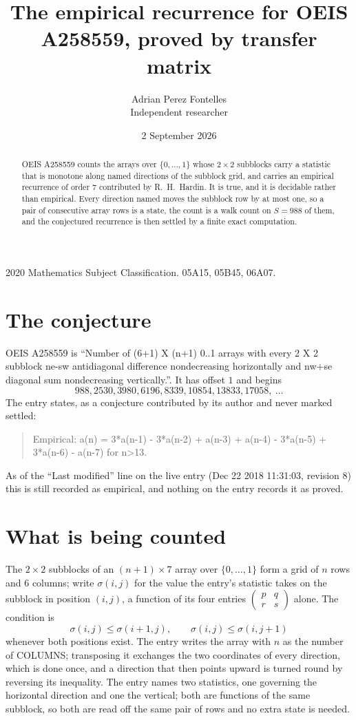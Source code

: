 \documentclass[11pt,a4paper]{article}
\title{The empirical recurrence for OEIS A258559, proved by transfer matrix}
\author{Adrian Perez Fontelles\\ \small Independent researcher}
\date{2 September 2026}
\theoremstyle{plain}
\theoremstyle{definition}
\begin{document}
\maketitle

\begin{abstract}
OEIS A258559 counts the arrays over $\{0,\dots,1\}$ whose $2\times2$ subblocks carry a
statistic that is monotone along named directions of the subblock grid, and carries an
empirical recurrence of order $7$ contributed by R.~H.~Hardin. It is true, and it is
decidable rather than empirical. Every direction named moves the subblock row by at most one,
so a pair of consecutive array rows is a state, the count is a walk count on $S=988$ of them,
and the conjectured recurrence is then settled by a finite exact computation.
\end{abstract}

\noindent\small 2020 Mathematics Subject Classification. 05A15, 05B45, 06A07.\normalsize

\section{The conjecture}

OEIS A258559 is ``Number of (6+1) X (n+1) 0..1 arrays with every 2 X 2 subblock ne-sw antidiagonal difference nondecreasing horizontally and nw+se diagonal sum nondecreasing vertically.''. It has offset $1$ and begins
\[
988, 2530, 3980, 6196, 8339, 10854, 13833, 17058,\ \dots
\]
The entry states, as a conjecture contributed by its author and never marked settled:
\begin{quote}
Empirical: a(n) = 3*a(n-1) - 3*a(n-2) + a(n-3) + a(n-4) - 3*a(n-5) + 3*a(n-6) - a(n-7) for n>13.
\end{quote}
As of the ``Last modified'' line on the live entry (Dec 22 2018 11:31:03, revision 8) this is still
recorded as empirical, and nothing on the entry records it as proved.

\section{What is being counted}

The $2\times2$ subblocks of an $(n+1)\times7$ array over $\{0,\dots,1\}$ form a grid
of $n$ rows and $6$ columns; write $\sigma(i,j)$ for the value the entry's statistic takes on
the subblock in position $(i,j)$, a function of its four entries
$\begin{pmatrix}p&q\\r&s\end{pmatrix}$ alone. The condition is
\[
\sigma(i,j)\le\sigma(i+1,j),\qquad \sigma(i,j)\le\sigma(i,j+1)
\]
whenever both positions exist. The entry writes the array with $n$ as the number of COLUMNS; transposing it exchanges the two coordinates of every direction, which is done once, and a direction that then points upward is turned round by reversing its inequality. The entry names two statistics, one governing the horizontal direction and one the vertical; both are functions of the same subblock, so both are read off the same pair of rows and no extra state is needed.
\end{document}
